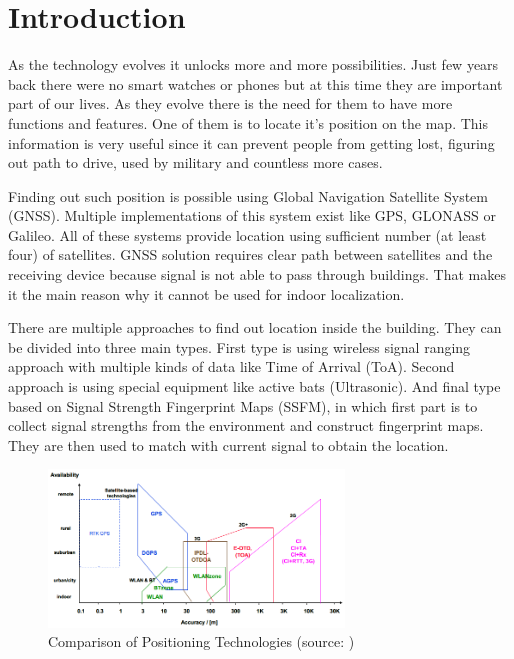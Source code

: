 \chapter{Introduction}\label{sec:Introduction}
\setcounter{page}{1}
As the technology evolves it unlocks more and more possibilities. Just few years back there were no smart watches or phones but at this time they are important part of our lives. As they evolve there is the need for them to have more functions and features. One of them is to locate it's position on the map. This information is very useful since it can prevent people from getting lost, figuring out path to drive, used by military and countless more cases.

Finding out such position is possible using Global Navigation Satellite System (GNSS). Multiple implementations of this system exist like GPS, GLONASS or Galileo. All of these systems provide location using sufficient number (at least four) of satellites.\cite{GNSS}\cite{GNSSGPS} GNSS solution requires clear path between satellites and the receiving device because signal is not able to pass through buildings. That makes it the main reason why it cannot be used for indoor localization.

There are multiple approaches to find out location inside the building. They can be divided into three main types. First type is using wireless signal ranging approach with multiple kinds of data like Time of Arrival (ToA). Second approach is using special equipment like active bats (Ultrasonic). And final type based on Signal Strength Fingerprint Maps (SSFM), in which first part is to collect signal strengths from the environment and construct fingerprint maps. They are then used to match with current signal to obtain the location.\cite{LocalizationApproaches}

\begin{figure}[h!]
	\begin{centering}
		\includegraphics[width=0.7\textwidth]{img/1_comparison_of_positionin_technologies}
		\par\end{centering}
	\caption{Comparison of Positioning Technologies (source: \cite{PedestrianDeadReckoning})\label{fig:1_comparison_of_positionin_technologies}}
\end{figure}

